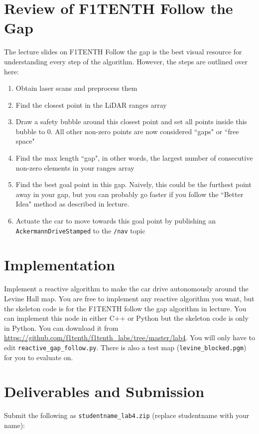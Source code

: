 \documentclass[letta4 paper]{article}
\numberwithin{equation}{section}
\newcommand{\0}{\mathbf{0}}
\begin{document}
	\section{Review of F1TENTH Follow the Gap}
	The lecture slides on F1TENTH Follow the gap is the best visual resource for understanding every step of the algorithm. However, the steps are outlined over here:
	\begin{enumerate}
		\item Obtain laser scans and preprocess them 
		\item Find the closest point in the LiDAR ranges array
		\item Draw a safety bubble around this closest point and set all points inside this bubble to 0. All other non-zero points are now considered ``gaps" or ``free space"
		\item Find the max length ``gap", in other words, the largest number of consecutive non-zero elements in your ranges array
		\item Find the best goal point in this gap. Naively, this could be the furthest point away in your gap, but you can probably go faster if you follow the ``Better Idea" method as described in lecture. 
		\item Actuate the car to move towards this goal point by publishing an \texttt{AckermannDriveStamped} to the \texttt{/nav} topic
	\end{enumerate}
	
	
	\section{Implementation}
	Implement a reactive algorithm to make the car drive autonomously around the Levine Hall map. You are free to implement any reactive algorithm  you want, but the skeleton code is for the F1TENTH follow the gap algorithm in lecture. You can implement this node in either C++ or Python but the skeleton code is only in Python. You can download it from \url{https://github.com/f1tenth/f1tenth_labs/tree/master/lab4}. You will only have to edit \texttt{reactive\_gap\_follow.py}. There is also a test map (\texttt{levine\_blocked.pgm}) for you to evaluate on.
	

	\section{Deliverables and Submission}
	Submit the following as \texttt{studentname\_lab4.zip} (replace studentname with your name):
	
\end{document}

